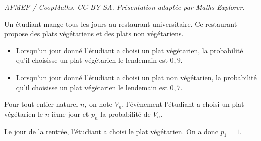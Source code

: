 \documentclass[10pt]{article}
\begin{document}
\noindent\textit{APMEP / CoopMaths. CC BY-SA. Présentation adaptée par Maths Explorer.}\par\medskip
\medskip

Un étudiant mange tous les jours au restaurant universitaire. Ce restaurant propose des plats végétariens et des plats non végétariens.

\begin{itemize}[label=$\bullet~~$]
\item Lorsqu'un jour donné l'étudiant a choisi un plat végétarien, la probabilité qu'il choisisse un plat végétarien le lendemain est $0,9$.
\item Lorsqu'un jour donné l'étudiant a choisi un plat non végétarien, la probabilité qu'il choisisse un plat végétarien le lendemain est $0,7$.
\end{itemize}

\medskip

Pour tout entier naturel $n$, on note $V_n$, l'évènement \og l'étudiant a choisi un plat végétarien le $n$-ième jour \fg{} et $p_n$ la probabilité de $V_n$.

Le jour de la rentrée, l'étudiant a choisi le plat végétarien. On a donc $p_1 = 1$.
\end{document}
